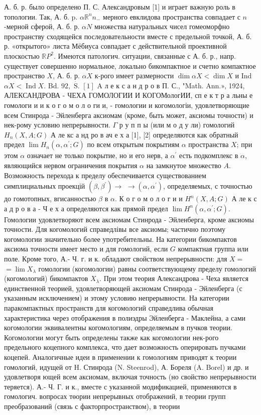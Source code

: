 \documentclass[10pt]{article}
\begin{document}
А. б. р. было определено П. С. Александровым [1] и играет важную роль в топологии. Так, А. б. p. $\alpha \mathbb{R}^{n} n_{-}$ мерного евклидова пространства совпадает с $n$-мерной сферой, А. б. р. $\alpha N$ множества натуральных чисел гомеоморфно пространству сходящейся последовательности вместе с предельной точкой, А. б. р. «открытого» листа Мёбиуса совпадает с действительной проективной плоскостью $\mathbb{R} P^{2}$. Имеются патологич. ситуации, связанные с А. б. р., напр. существует совершенно нормальное, локально бикомпактное и счетно компактное пространство $X$, А. б. р. $\alpha X$ к-рого имеет размерности $\operatorname{dim} \alpha X<\operatorname{dim} X$ и Ind $\alpha X<\operatorname{Ind} X$. Bd. $92, \dot{\text { S. }}[1]$ A л е к с а н д р о в П. С., "Math. Ann.», 1924, АЛЕКСАНДРОВА - ЧЕХА ГОМОЛОГИИ И КОГОМологИИ, сп е к т р а льны е гомологи и и к о г о м о л о ги и, - гомологии и когомологіи, удовлетворяющие всем Стинрода - Эйленберга аксиомам (кроме, быть может, аксиомы точности) и нек-рому условию непрерывности. $\Gamma$ р у п п ы (или м о д у ли) гомологий $H_{n}(X, A ; G)$ А ле кс а нд ро в ач е х а [1], [2] определяются как обратный предел $\lim H_{n}\left(\alpha, \alpha^{\prime} ; G\right)$ по всем открытым покрытиям $\alpha$ пространства $X$; при этом $\alpha$ означает не только покрытие, но и его нерв, а $\alpha^{\prime}$ есть подкомплекс в $\alpha$, являющийся нервом ограничения покрытия $\alpha$ на замкнутое множество $A$. Возможность перехода к пределу обеспечивается существованием симплициальных проекцій $\left(\beta, \beta^{\prime}\right) \rightarrow$ $\rightarrow\left(\alpha, \alpha^{\prime}\right)$, определяемых, с точностью до гомотопных, вгисанностью $\beta$ в $\alpha$. К о г о м о л о г и и $H^{n}(X, A ; G)$ А ле к с а д р о в а - Ч е х а определяются как прямой предел $\lim H^{n}\left(\alpha, \alpha^{\prime} ; G\right)$. Гомологии удовлетворяют всем аксиомам Стинрода - Эйленберга, кроме аксиомы точности. Для когомологий справедлівы все аксиомы; частично поэтому когомологии значительно более употребительны. На категории бикомпактов аксиома точности имеет место и для гомологий, если $G$ компактная группа или поле. Кроме того, А.- Ч. г. и к. обладают свойством непрерывности: для $X=$ $=\lim X_{\lambda}$ гомологии (когомологии) равны соответствующему пределу гомологий (когомологий) бикомпактов $X_{\lambda}$. При этом теория Александрова - Чеха является единственной теорией, удовлетворяющей аксиомам Стинрода - Эйленберга (с указанным исключением) и этому условию непрерывности. На категории паракомпактных пространств для когомологий справедлива обычная характеристика через отображения в полиэдры Эйленберга - Маклейна, а сами когомологии эквивалентны когомологиям, определяемым в пучков теории. Когомологии могут быть определены также как когомологии нек-рого предельного коцепного комплекса, что дает возможность оперировать пучками коцепей. Аналогичные идеи в применении к гомологиям приводят к теории гомологий, идущей от H. Стинрода (N. Steenrod), А. Бореля (A. Borel) и др. и удовлетворя ющей всем аксиомам, включая точность (но свойство непрерывности теряется). А.- Ч. Г. и к., вместе с указанной модификацией, применяются в гомологич. вопросах төории непрерывных отображений, в теории групп преобразований (связь с факторпространством), в теории 
\end{document}
